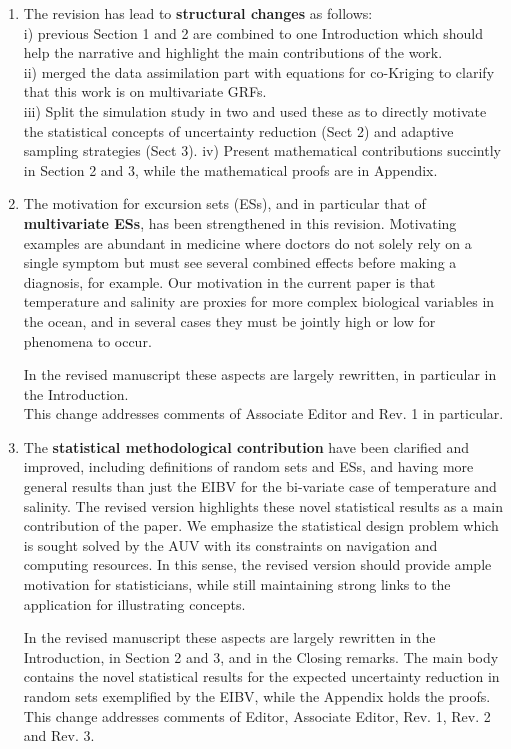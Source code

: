 \documentclass[a4paper]{article}
\begin{document}
\begin{enumerate}
\item The revision has lead to {\bf{structural changes}} as follows: \\
    i) previous Section 1 and 2 are combined to one Introduction which should help the narrative and highlight the main contributions of the work. \\
    ii) merged the data assimilation part with equations for co-Kriging to clarify that this work is on multivariate GRFs. \\
    iii) Split the simulation study in two and used these as to directly motivate the statistical concepts of uncertainty reduction (Sect 2) and adaptive sampling strategies (Sect 3).
    iv) Present mathematical contributions succintly in Section 2 and 3, while the mathematical proofs are in Appendix.

\item The motivation for excursion sets (ESs), and in particular that of {\bf{multivariate ESs}}, has been strengthened in this revision. Motivating examples are abundant in medicine where doctors do not solely rely on a single symptom but must see several combined effects before making a diagnosis, for example. Our motivation in the current paper is that temperature and salinity are proxies for more complex biological variables in the ocean, and in several cases they must be jointly high or low for phenomena to occur. 

In the revised manuscript these aspects are largely rewritten, in particular in the Introduction. \\
This change addresses comments of Associate Editor and Rev. 1 in particular.

\item The {\bf{statistical methodological contribution}} have been clarified and improved, including definitions of random sets and ESs, and having more general results than just the EIBV for the bi-variate case of temperature and salinity. The revised version highlights these novel statistical results as a main contribution of the paper. 
We emphasize the statistical design problem which is sought solved by the AUV with its constraints on navigation and computing resources.
In this sense, the revised version should provide ample motivation for statisticians, while still maintaining strong links to the application for illustrating concepts.

In the revised manuscript these aspects are largely rewritten in the Introduction, in Section 2 and 3, and in the Closing remarks. The main body contains the novel statistical results for the expected uncertainty reduction in random sets exemplified by the EIBV, while the Appendix holds the proofs. \\
This change addresses comments of Editor, Associate Editor, Rev. 1, Rev. 2 and Rev. 3.


\end{enumerate}
\end{document}
